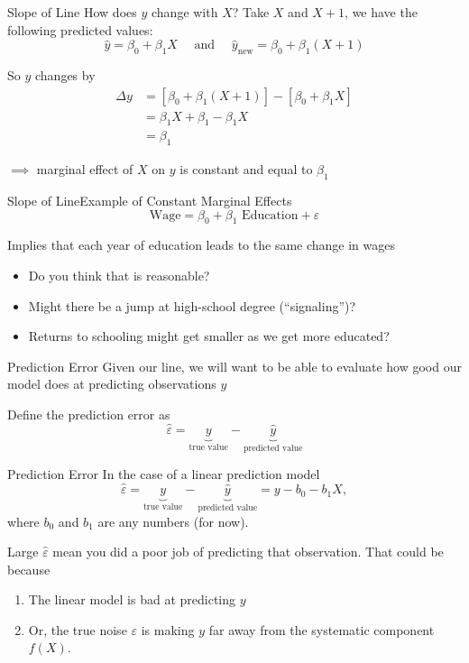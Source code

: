 \documentclass[aspectratio=169,t,11pt,table]{beamer}
\begin{document}
\begin{frame}{Slope of Line}
  How does $y$ change with $X$? Take $X$ and $X + 1$, we have the following predicted values:
  $$
    \hat{y} = \beta_0 + \beta_1 X \quad\text{ and }\quad 
    \hat{y}_{\text{new}} = \beta_0 + \beta_1 (X + 1)
  $$

  \bigskip
  So $y$ changes by 
  \begin{align*}
    \Delta y &= \left[ \beta_0 + \beta_1 (X + 1) \right] - \left[ \beta_0 + \beta_1 X \right] \\
    &= \beta_1 X + \beta_1 - \beta_1 X \\ 
    &= \beta_1
  \end{align*}

  \bigskip
  $\implies$ marginal effect of $X$ on $y$ is constant and equal to $\beta_1$
\end{frame}

\begin{frame}{Slope of Line}{Example of Constant Marginal Effects}
  \vspace*{-2\bigskipamount}
  $$
    \text{Wage} = \beta_0 + \beta_1 \text{ Education} + \varepsilon
  $$

  Implies that each year of education leads to the same change in wages
  \begin{itemize}
    \item Do you think that is reasonable?
    
    \pause
    \item Might there be a jump at high-school degree (``signaling'')?
    
    \item Returns to schooling might get smaller as we get more educated?
  \end{itemize}
\end{frame}



\begin{frame}{Prediction Error}
  Given our line, we will want to be able to evaluate how good our model does at predicting observations $y$

  \bigskip
  Define the \alert{prediction error} as 
  $$
    \hat{\varepsilon} = \underbrace{y}_{\text{true value}} - \underbrace{\hat{y}}_{\text{predicted value}} 
  $$

\end{frame}

\begin{frame}{Prediction Error}
  In the case of a linear prediction model
  $$
    \hat{\varepsilon} = \underbrace{y}_{\text{true value}} - \underbrace{\hat{y}}_{\text{predicted value}} = y - b_0 - b_1 X,
  $$
  where $b_0$ and $b_1$ are any numbers (for now).

  \bigskip
  Large $\hat{\varepsilon}$ mean you did a poor job of predicting that observation. That could be because
  \begin{enumerate}
    \item The linear model is bad at predicting $y$
    \item Or, the true noise $\varepsilon$ is making $y$ far away from the systematic component $f(X)$.
  \end{enumerate}
\end{frame}
\end{document}
